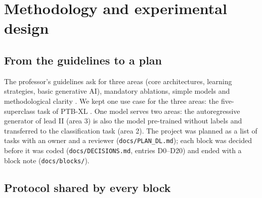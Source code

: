 \section{Methodology and experimental design}\label{sec:method}

\subsection{From the guidelines to a plan}

The professor's guidelines ask for three areas (core architectures, learning strategies, basic
generative AI), mandatory ablations, simple models and methodological clarity
\cite{course_message_2011}. We kept one use case for the three areas: the five-superclass task of
PTB-XL \cite{wagner2020ptbxl}. One model serves two areas: the autoregressive generator of lead II
(area 3) is also the model pre-trained without labels and transferred to the classification task
(area 2). The project was planned as a list of tasks with an owner and a reviewer
(\texttt{docs/PLAN\_DL.md}); each block was decided before it was coded (\texttt{docs/DECISIONS.md},
entries D0--D20) and ended with a block note (\texttt{docs/blocks/}).

\subsection{Protocol shared by every block}

